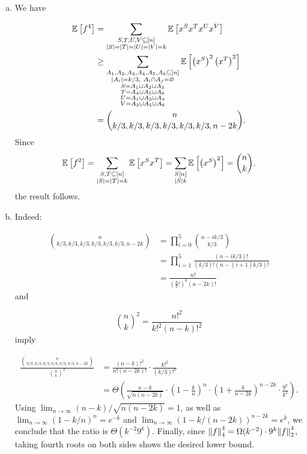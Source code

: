 \documentclass[12pt]{article}
\newcommand{\E}[2]{\mathbb E_{#1}\left[#2\right]}
\newcommand{\eqn}[1]{\begin{equation*}#1\end{equation*}}
\begin{document}
\begin{enumerate}[(a)]
    \item We have

    \begin{align*}
        \E{}{f^4} &= \sum_{\substack{S,T,U,V \subseteq [n]\\\abs{S} = \abs{T} = \abs{U} = \abs{V} = k}} \E{}{x^S x^T x^U x^V}\\
        &\geq \sum_{\substack{A_1, A_2, A_3, A_4, A_5, A_6 \subseteq [n]\\\abs{A_i} = k/3,~ A_i \cap A_j = \varnothing\\S = A_1 \cup A_2 \cup A_3\\T = A_4 \cup A_5 \cup A_6\\U = A_1 \cup A_3 \cup A_4\\V = A_2 \cup A_5 \cup A_6}} \E{}{\left(x^S\right)^2 \left(x^T\right)^2}\\
        &= \binom{n}{k/3, k/3, k/3, k/3, k/3, k/3, n - 2k}.
    \end{align*}
    Since
    \eqn{\E{}{f^2} = \sum_{\substack{S, T \subseteq [n]\\\abs{S} = \abs{T} = k}} \E{}{x^S x^T} = \sum_{\substack{S [n]\\\abs{S} k}} \E{}{\left(x^S\right)^2} = \binom{n}{k},}
    the result follows.

    \item Indeed:
    
    \begin{align*}
        \binom{n}{k/3, k/3, k/3, k/3, k/3, k/3, n - 2k} &= \prod_{i = 0}^5 \binom{n - ik/3}{k/3}\\
        &= \prod_{i = 1}^5 \frac{(n - ik/3)!}{(k/3)! (n-(i+1)k/3)!}\\
        &= \frac{n!}{\left(\frac{k}{3}!\right)^6 (n - 2k)!}
    \end{align*}
    and
    
    \eqn{\binom{n}{k}^2 = \frac{n!^2}{k!^2 (n-k)!^2}}
    imply
    
    \begin{align*}
        \frac{\binom{n}{k/3, k/3, k/3, k/3, k/3, k/3, n - 2k}}{\binom{n}{k}^2} &= \frac{(n-k)!^2}{n! (n-2k)!} \cdot \frac{k!^2}{(k/3)!^6}\\
        &= \Theta\left(\frac{n-k}{\sqrt{n(n-2k)}} \cdot \left(1 - \frac{k}{n}\right)^n \cdot \left(1 + \frac{k}{n-2k}\right)^{n-2k} \cdot \frac{9^k}{k^2}\right).
    \end{align*}
    Using $\lim_{n \to \infty} (n-k)/\sqrt{n(n-2k)} = 1$, as well as $\lim_{n \to \infty}(1-k/n)^n = e^{-k}$ and $\lim_{n \to \infty}(1-k/(n-2k))^{n-2k} = e^k$, we conclude that the ratio is $\Theta(k^{-2} 9^k)$. Finally, since $\norm{f}_4^4 = \Omega(k^{-2}) \cdot 9^k \norm{f}_2^4$, taking fourth roots on both sides shows the desired lower bound.
    
\end{enumerate}
\end{document}
